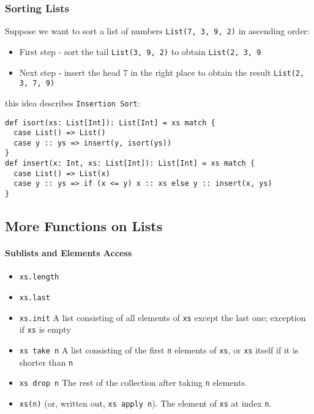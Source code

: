 \documentclass{scrartcl}
\newcommand{\term}[1]{\verb~#1~} %
\begin{document}
\subsubsection{Sorting Lists}
\label{sec:SortingLists}

Suppose we want to sort a list of numbers \lstinline|List(7, 3, 9, 2)| in
ascending order:
\begin{itemize}
\item First step - sort the tail \lstinline|List(3, 9, 2)| to obtain
  \lstinline|List(2, 3, 9|
\item Next step - insert the head 7 in the right place to obtain the result
  \lstinline|List(2, 3, 7, 9)|
\end{itemize}
this idea describes \term{Insertion Sort}:
\begin{lstlisting}
def isort(xs: List[Int]): List[Int] = xs match {
  case List() => List()
  case y :: ys => insert(y, isort(ys))
}
def insert(x: Int, xs: List[Int]): List[Int] = xs match {
  case List() => List(x)
  case y :: ys => if (x <= y) x :: xs else y :: insert(x, ys)
}
\end{lstlisting}

\subsection{More Functions on Lists}
\label{sec:MoreFunctionsOnLists}

\paragraph{Sublists and Elements Access}
\begin{itemize}
\item \lstinline|xs.length|
\item \lstinline|xs.last|
\item \lstinline|xs.init| A list consisting of all elements of \lstinline|xs|
  except the last one; exception if \lstinline|xs| is empty
\item \lstinline|xs take n| A list consisting of the first \lstinline|n|
  elements of \lstinline|xs|, or \lstinline|xs| itself if it is shorter than
  \lstinline|n|
\item \lstinline|xs drop n| The rest of the collection after taking
  \lstinline|n| elements.
\item \lstinline|xs(n)| (or, written out, \lstinline|xs apply n|). The element
  of \lstinline|xs| at index \lstinline|n|.
\end{itemize}
\end{document}
